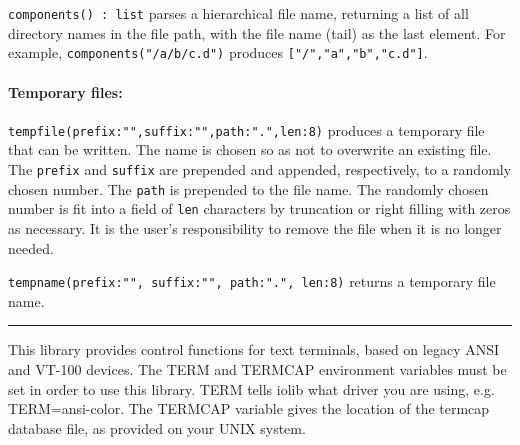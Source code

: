 \texttt{components() : list} parses a hierarchical file name, returning
a list of all directory names in the file path, with the file name
(tail) as the last element. For example,
\texttt{components("/a/b/c.d")} produces
\texttt{["/","a","b","c.d"]}.

\paragraph{Temporary files:}
\texttt{tempfile(prefix:"",suffix:"",path:".",len:8)}
produces a temporary file that can be written. The name is chosen so as
not to overwrite an existing file. The \texttt{prefix} and
\texttt{suffix} are prepended and appended, respectively, to a randomly
chosen number. The \texttt{path} is prepended to the file name. The
randomly chosen number is fit into a field of \texttt{len} characters
by truncation or right filling with zeros as necessary. It is the
user's responsibility to remove the file when it is no
longer needed.

\texttt{tempname(prefix:"",
suffix:"",
path:".", len:8)} returns a
temporary file name.

\vspace{0.25cm}\hrule{}

This library provides control functions for text terminals, based on
legacy ANSI and VT-100 devices. The TERM and TERMCAP environment variables must be set in order to use
this library. TERM tells iolib what driver you are using,
e.g. TERM=ansi-color. The TERMCAP variable
gives the location of the termcap database file, as provided on your
UNIX system.




